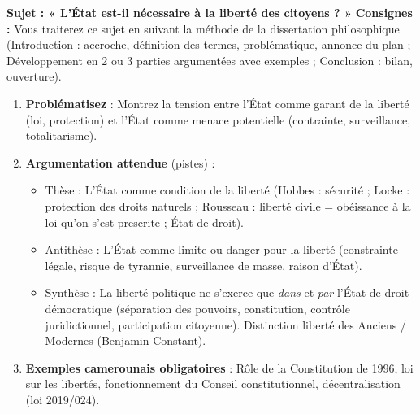\documentclass[11pt]{article}
\newcommand{\cle}[1]{{\popxbold\color{popdark}#1}}
\begin{document}
\begin{exercice}
\textbf{Sujet : « L'État est-il nécessaire à la liberté des citoyens ? »}
\textbf{Consignes :} Vous traiterez ce sujet en suivant la méthode de la dissertation philosophique (Introduction : accroche, définition des termes, problématique, annonce du plan ; Développement en 2 ou 3 parties argumentées avec exemples ; Conclusion : bilan, ouverture).
\begin{enumerate}
    \item \textbf{Problématisez} : Montrez la tension entre l'État comme garant de la liberté (loi, protection) et l'État comme menace potentielle (contrainte, surveillance, totalitarisme).
    \item \textbf{Argumentation attendue} (pistes) :
    \begin{itemize}
        \item Thèse : L'État comme condition de la liberté (Hobbes : sécurité ; Locke : protection des droits naturels ; Rousseau : liberté civile = obéissance à la loi qu'on s'est prescrite ; \cle{État de droit}).
        \item Antithèse : L'État comme limite ou danger pour la liberté (constrainte légale, risque de tyrannie, surveillance de masse, raison d'État).
        \item Synthèse : La liberté politique ne s'exerce que \emph{dans} et \emph{par} l'État de droit démocratique (séparation des pouvoirs, constitution, contrôle juridictionnel, participation citoyenne). Distinction liberté des Anciens / Modernes (Benjamin Constant).
    \end{itemize}
    \item \textbf{Exemples camerounais obligatoires} : Rôle de la Constitution de 1996, loi sur les libertés, fonctionnement du Conseil constitutionnel, décentralisation (loi 2019/024).
\end{enumerate}
\end{exercice}
\end{document}

